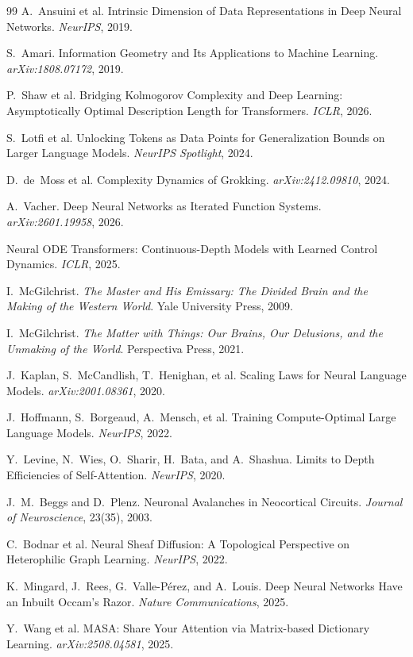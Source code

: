 \documentclass[11pt, a4paper]{article}
\theoremstyle{remark}
\begin{document}
\begin{thebibliography}{99}
A.~Ansuini et al.
\newblock Intrinsic Dimension of Data Representations in Deep Neural Networks.
\newblock \emph{NeurIPS}, 2019.

S.~Amari.
\newblock Information Geometry and Its Applications to Machine Learning.
\newblock \emph{arXiv:1808.07172}, 2019.

P.~Shaw et al.
\newblock Bridging Kolmogorov Complexity and Deep Learning: Asymptotically Optimal Description Length for Transformers.
\newblock \emph{ICLR}, 2026.

S.~Lotfi et al.
\newblock Unlocking Tokens as Data Points for Generalization Bounds on Larger Language Models.
\newblock \emph{NeurIPS Spotlight}, 2024.

D.~de~Moss et al.
\newblock Complexity Dynamics of Grokking.
\newblock \emph{arXiv:2412.09810}, 2024.

A.~Vacher.
\newblock Deep Neural Networks as Iterated Function Systems.
\newblock \emph{arXiv:2601.19958}, 2026.

Neural ODE Transformers: Continuous-Depth Models with Learned Control Dynamics. \emph{ICLR}, 2025.

I.~McGilchrist.
\newblock \emph{The Master and His Emissary: The Divided Brain and the Making of the Western World}.
\newblock Yale University Press, 2009.

I.~McGilchrist.
\newblock \emph{The Matter with Things: Our Brains, Our Delusions, and the Unmaking of the World}.
\newblock Perspectiva Press, 2021.

J.~Kaplan, S.~McCandlish, T.~Henighan, et al.
\newblock Scaling Laws for Neural Language Models.
\newblock \emph{arXiv:2001.08361}, 2020.

J.~Hoffmann, S.~Borgeaud, A.~Mensch, et al.
\newblock Training Compute-Optimal Large Language Models.
\newblock \emph{NeurIPS}, 2022.

Y.~Levine, N.~Wies, O.~Sharir, H.~Bata, and A.~Shashua.
\newblock Limits to Depth Efficiencies of Self-Attention.
\newblock \emph{NeurIPS}, 2020.

J.~M.~Beggs and D.~Plenz.
\newblock Neuronal Avalanches in Neocortical Circuits.
\newblock \emph{Journal of Neuroscience}, 23(35), 2003.

C.~Bodnar et al.
\newblock Neural Sheaf Diffusion: A Topological Perspective on Heterophilic Graph Learning.
\newblock \emph{NeurIPS}, 2022.

K.~Mingard, J.~Rees, G.~Valle-P\'{e}rez, and A.~Louis.
\newblock Deep Neural Networks Have an Inbuilt Occam's Razor.
\newblock \emph{Nature Communications}, 2025.

Y.~Wang et al.
\newblock MASA: Share Your Attention via Matrix-based Dictionary Learning.
\newblock \emph{arXiv:2508.04581}, 2025.

\end{thebibliography}
\end{document}
